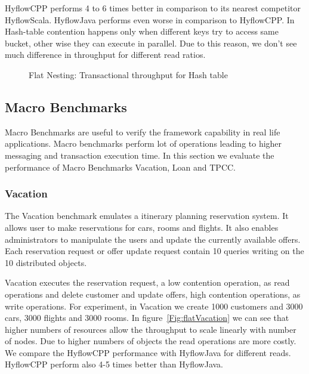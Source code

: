 \documentclass[12pt,english]{report}
\begin{document}
HyflowCPP performs 4 to 6 times better in comparison to its nearest competitor HyflowScala. HyflowJava performs even worse in comparison to HyflowCPP. In Hash-table contention happens only when different keys try to access same bucket, other wise they can execute in parallel. Due to this reason, we don't see much difference in throughput for different read ratios.

\begin{figure}[H]
\centering
{}
\end{figure}
\begin{figure}[H]
\centering
{}
\end{figure}
\begin{figure}[H]
\centering
{}
\caption{Flat Nesting: Transactional throughput for Hash table}
\label{Fig:flatHashTable}
\end{figure}

\subsection{Macro Benchmarks}

Macro Benchmarks are useful to verify the framework capability in real life applications. Macro benchmarks perform lot of operations leading to higher messaging and transaction execution time. In this section we evaluate the performance of Macro Benchmarks Vacation, Loan and TPCC.

\subsubsection{Vacation}

The Vacation benchmark emulates a itinerary planning reservation system. It allows user to make reservations for cars, rooms and flights. It also enables administrators to manipulate the users and update the currently available offers. Each reservation request or offer update request contain 10 queries writing on the 10 distributed objects. 

Vacation executes the reservation request, a low contention operation, as read operations and delete customer and update offers, high contention operations, as write operations. For experiment, in Vacation we create 1000 customers and 3000 cars, 3000 flights and 3000 rooms. In figure~\ref{Fig:flatVacation} we can see  that higher numbers of resources allow the throughput to scale linearly with number of nodes. Due to higher numbers of objects the read operations are more costly. We compare the HyflowCPP performance with HyflowJava for different reads. HyflowCPP perform also 4-5 times better than HyflowJava. 
\end{document}
